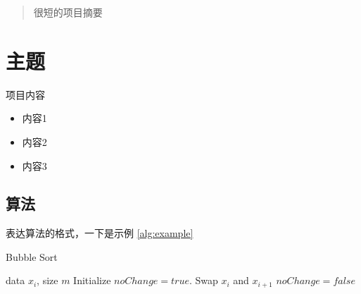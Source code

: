 \documentclass{article}
\theoremstyle{plain}
\theoremstyle{definition}
\theoremstyle{remark}
\begin{document}

\begin{abstract}
很短的项目摘要
\end{abstract}

\section{主题}
项目内容

\begin{itemize}
\item 内容1
\item 内容2
\item 内容3
\end{itemize}


\subsection{算法}
表达算法的格式，一下是示例
\cref{alg:example} 
\begin{algorithm}[htb]
   \caption{Bubble Sort}
   \label{alg:example}
\begin{algorithmic}
    data $x_i$, size $m$
   \REPEAT
   \STATE Initialize $noChange = true$.
   \STATE Swap $x_i$ and $x_{i+1}$
   \STATE $noChange = false$
   \ENDIF
   \ENDFOR
\end{algorithmic}
\end{algorithm}

\end{document}
